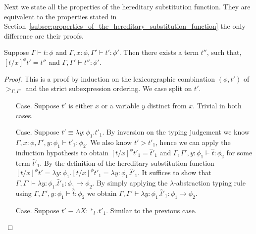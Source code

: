 \noindent Next we state all the properties of the hereditary
substitution function.  They are equivalent to the properties stated
in
Section~\ref{subsec:properties_of_the_hereditary_substitution_function}
the only difference are their proofs.
\begin{lemma}
  \label{lemma:total_ssf}
  Suppose $\Gamma \vdash t : \phi$ and $\Gamma, x:\phi, \Gamma' \vdash t':\phi'$. Then
  there exists a term $t''$, such that, $[t/x]^\phi t' = t''$ and $\Gamma,\Gamma' \vdash t'':\phi'$.
\end{lemma}
\begin{proof}
  This is a proof by induction on the lexicorgraphic combination $(\phi, t')$ of $>_{\Gamma,\Gamma'}$ and
the strict subexpression ordering.  We case split on $t'$.

\begin{itemize}
\item[Case.] Suppose $t'$ is either $x$ or a variable $y$ distinct from $x$.  
  Trivial in both cases.
  
\item[Case.] Suppose $t' \equiv \lambda y:\phi_1.t'_1$.  By inversion on the
  typing judgement we know $\Gamma,x:\phi,\Gamma',y:\phi_1 \vdash t'_1:\phi_2$.
  We also know $t' > t'_1$, hence we can apply the induction hypothesis to obtain
  $[t/x]^\phi t'_1 = \hat{t}'_1$ and $\Gamma,\Gamma',y:\phi_1 \vdash \hat{t}:\phi_2$
  for some term $\hat{t}'_1$.  By the definition of the hereditary substitution function 
  $[t/x]^\phi t' = \lambda y:\phi_1.[t/x]^\phi t'_1 = \lambda y:\phi_1.\hat{t}'_1$.  It suffices
  to show that $\Gamma,\Gamma' \vdash \lambda y:\phi_1.\hat{t}'_1:\phi_1 \to \phi_2$.  
  By simply applying the $\lambda$-abstraction typing rule using
  $\Gamma,\Gamma',y:\phi_1 \vdash \hat{t}:\phi_2$ we obtain 
  $\Gamma,\Gamma' \vdash \lambda y:\phi_1.\hat{t}'_1:\phi_1 \to \phi_2$.
  
\item[Case.] Suppose $t' \equiv \Lambda X:*_l.t'_1$.  Similar to the previous case.
  

\end{itemize}
\end{proof}
